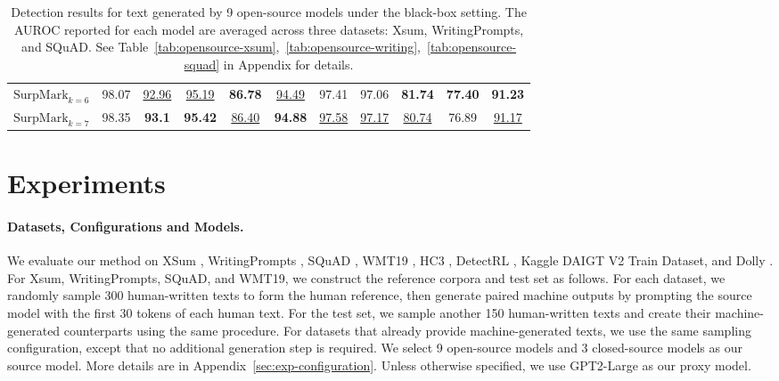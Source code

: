 \documentclass{article}
\theoremstyle{plain}
\theoremstyle{definition}
\theoremstyle{remark}
\begin{document}
\begin{table}[h]
{{\begin{tabular}{lcccccccccc}
\rowcolor{ours}$\text{SurpMark}_{k=6}$ & 98.07 & \underline{92.96} & \underline{95.19} & \textbf{86.78} & \underline{94.49} & 97.41 & 97.06 & \textbf{81.74} & \textbf{77.40} &\textbf{91.23}\\

\rowcolor{ours}$\text{SurpMark}_{k=7}$ & {98.35} & \textbf{93.1} & \textbf{95.42} & \underline{86.40} & \textbf{94.88} & \underline{97.58} & \underline{97.17} & \underline{80.74} & 76.89   &\underline{91.17}\\
\bottomrule
\end{tabular}}}
\caption{Detection results for text generated by 9 open-source models under the black-box setting. The AUROC reported for each model are averaged across three datasets: Xsum, WritingPrompts, and SQuAD. See Table~\ref{tab:opensource-xsum},~\ref{tab:opensource-writing},~\ref{tab:opensource-squad} in Appendix for details.}
\label{tab:opensource}
\end{table}

\section{Experiments} \label{sec:exp}

\paragraph{Datasets, Configurations and Models.} We evaluate our method on XSum \cite{narayan-etal-2018-dont}, WritingPrompts \cite{fan-etal-2018-hierarchical}, SQuAD \cite{rajpurkar-etal-2016-squad}, WMT19 \cite{barrault-etal-2019-findings}, HC3 \cite{guo2023closechatgpthumanexperts}, DetectRL \cite{wu2024detectrl}, Kaggle DAIGT V2 Train Dataset, and Dolly \cite{DatabricksBlog2023DollyV2}. For Xsum, WritingPrompts, SQuAD, and WMT19, we construct the reference corpora and test set as follows. For each dataset, we randomly sample 300 human-written texts to form the human reference, then generate paired machine outputs by prompting the source model with the first 30 tokens of each human text. For the test set, we sample another 150 human-written texts and create their machine-generated counterparts using the same procedure. For datasets that already provide machine-generated texts, we use the same sampling configuration, except that no additional generation step is required. We select 9 open-source models and 3 closed-source models as our source model. More details are in Appendix~\ref{sec:exp-configuration}. Unless otherwise specified, we use GPT2-Large as our proxy model.
\end{document}
